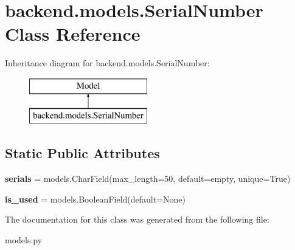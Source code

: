 \hypertarget{classbackend_1_1models_1_1_serial_number}{}\section{backend.\+models.\+Serial\+Number Class Reference}
\label{classbackend_1_1models_1_1_serial_number}
Inheritance diagram for backend.\+models.\+Serial\+Number\+:\begin{figure}[H]
\begin{center}
\leavevmode
\includegraphics[height=2.000000cm]{classbackend_1_1models_1_1_serial_number}
\end{center}
\end{figure}
\subsection*{Static Public Attributes}
\begin{DoxyCompactItemize}
\item 
\mbox{\label{classbackend_1_1models_1_1_serial_number_a1340ce7cac3c62e98d1e5dd0678fbd64}} 
{\bfseries serials} = models.\+Char\+Field(max\+\_\+length=50, default=\textquotesingle{}empty\textquotesingle{}, unique=True)
\item 
\mbox{\label{classbackend_1_1models_1_1_serial_number_a681639e029fcd8bfd11ffd78137d5eb1}} 
{\bfseries is\+\_\+used} = models.\+Boolean\+Field(default=None)
\end{DoxyCompactItemize}


The documentation for this class was generated from the following file\+:\begin{DoxyCompactItemize}
\item 
models.\+py\end{DoxyCompactItemize}
